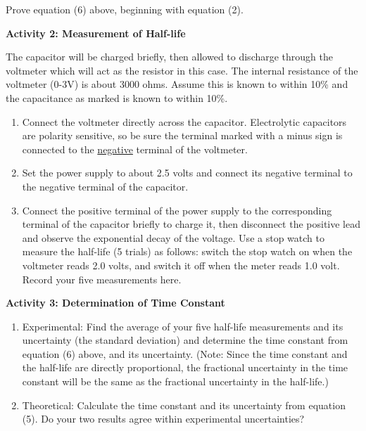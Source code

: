 Prove equation (6) above, beginning with equation (2).
\vspace{3in}

\textbf{Activity 2: Measurement of Half-life}

The capacitor will be charged briefly, then allowed to discharge through the
voltmeter which will act as the resistor in this case. The internal resistance
of the voltmeter (0-3V) is about 3000 ohms.  Assume this is known to within
10\% and the capacitance as marked is known to within 10\%.

\begin{enumerate}
\item Connect the voltmeter directly across the capacitor.  Electrolytic
capacitors are polarity sensitive, so be sure the terminal marked with a minus
sign is connected to the \underline{negative} terminal of the voltmeter.

\item Set the power supply to about 2.5 volts and connect its negative terminal
to the negative terminal of the capacitor.

\item Connect the positive terminal of the power supply to the corresponding
terminal of the capacitor briefly to charge it, then disconnect the positive 
lead and observe the exponential decay of the voltage.  Use a stop watch to 
measure the half-life (5 trials) as follows: switch the stop watch on when the 
voltmeter reads 2.0 volts, and switch it off when the meter reads 1.0 volt. 
Record your five measurements here.\vspace{30mm}

\end{enumerate}

\textbf{Activity 3: Determination of Time Constant}

\begin{enumerate}
\item Experimental:  Find the average of your five half-life measurements and 
its uncertainty (the standard deviation) and determine the time constant from 
equation (6) above, and its uncertainty. (Note: Since the time constant and the 
half-life are directly proportional, the fractional uncertainty in the time 
constant will be the same as the fractional uncertainty in the half-life.)
\vspace{40mm}
\item Theoretical:  Calculate the time constant and its uncertainty from 
equation (5). Do your two results agree within experimental uncertainties?
\end{enumerate}

